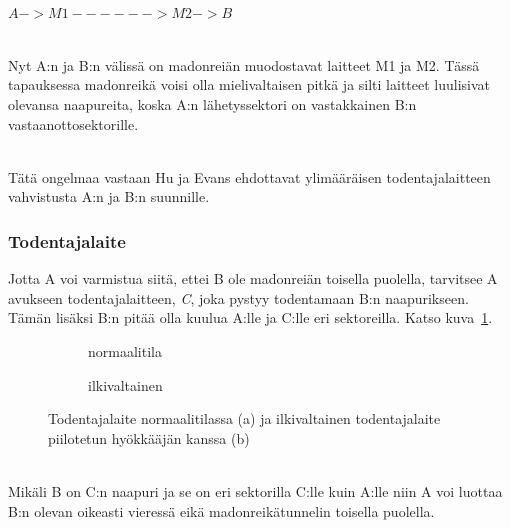 \documentclass[finnish]{tktltiki2}
\theoremstyle{definition}
\theoremstyle{remark}
\begin{document}
\noindent\\
{\centering $A -> M1 ------> M2 -> B$\\}


\noindent\\
Nyt A:n ja B:n välissä on madonreiän muodostavat laitteet M1 ja M2. Tässä tapauksessa madonreikä voisi olla mielivaltaisen pitkä ja silti laitteet luulisivat olevansa naapureita, koska A:n lähetyssektori on vastakkainen B:n vastaanottosektorille. 

\noindent\\
Tätä ongelmaa vastaan Hu ja Evans ehdottavat ylimääräisen todentajalaitteen vahvistusta A:n ja B:n suunnille.

\subsubsection{Todentajalaite}

Jotta A voi varmistua siitä, ettei B ole madonreiän toisella puolella, tarvitsee A avukseen todentajalaitteen, \emph{C}, joka pystyy todentamaan B:n naapurikseen. Tämän lisäksi B:n pitää olla kuulua A:lle ja C:lle eri sektoreilla. Katso kuva~\ref{fig:todentaja1}.

\begin{figure}[h]
	\begin{subfigure}{.5\textwidth}
		\centering
		\caption{normaalitila}
		\label{fig:todentaja1}
	\end{subfigure}%
	\begin{subfigure}{.5\textwidth}
		\centering
		\caption{ilkivaltainen}
		\label{fig:todentaja2}
	\end{subfigure}%
	\caption{Todentajalaite normaalitilassa (a) ja ilkivaltainen todentajalaite piilotetun hyökkääjän kanssa (b)}
	\label{fig:todentajalaitteet}
\end{figure}
\noindent\\
Mikäli B on C:n naapuri ja se on eri sektorilla C:lle kuin A:lle niin A voi luottaa B:n olevan oikeasti vieressä eikä madonreikätunnelin toisella puolella.
\end{document}
